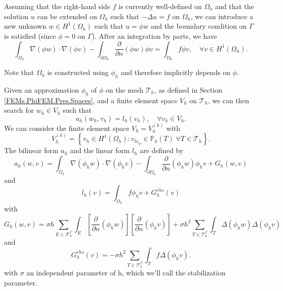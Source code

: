 Assuming that the right-hand side $f$ is currently well-defined on $\Omega_h$ and that the solution $u$ can be extended on $\Omega_h$ such that $-\Delta u=f$ on $\Omega_h$, we can introduce a new unknown $w\in H^1(\Omega_h)$ such that $u=\phi w$ and the boundary condition on $\Gamma$ is satisfied (since $\phi=0$ on $\Gamma$). After an integration by parts, we have
\begin{equation*}
	\int_{\Omega_h}\nabla(\phi w)\cdot\nabla(\phi v)-\int_{\partial\Omega_h}\frac{\partial}{\partial n}(\phi w)\phi v=\int_{\Omega_h} f\phi v,\quad \forall v\in H^1(\Omega_h).
\end{equation*}
\begin{Rem}
	Note that $\Omega_h$ is constructed using $\phi_h$ and therefore implicitly depends on $\phi$.
\end{Rem}
Given an approximation $\phi_h$ of $\phi$ on the mesh $\mathcal{T}_h$, as defined in Section \ref{FEMs.PhiFEM.Pres.Spaces}, and a finite element space $V_h$ on $\mathcal{T}_h$, we can then search for $w_h\in V_h$ such that
\begin{equation*}
	a_h(w_h,v_h)=l_h(v_h), \quad \forall v_h\in V_h.
\end{equation*}
We can consider the finite element space $V_h=V_h^{(k)}$ with
\begin{equation*}
	V_h^{(k)}=\left\{v_h\in H^1(\Omega_h):v_{h|_T}\in\mathbb{P}_k(T) \;  \forall T\in\mathcal{T}_h\right\}.
\end{equation*}
The bilinear form $a_h$ and the linear form $l_h$ are defined by
\begin{equation*}
	a_h(w,v)=\int_{\Omega_h} \nabla (\phi_h w) \cdot \nabla (\phi_h v) - \int_{\partial\Omega_h} \frac{\partial}{\partial n}(\phi_h w)\phi_h v+G_h(w,v)
\end{equation*}
and
\begin{equation*}
	l_h(v)=\int_{\Omega_h} f \phi_h v + G_h^{rhs}(v)
\end{equation*}
with
\begin{equation*}
G_h(w,v)=\sigma h\sum_{E\in\mathcal{F}_h^\Gamma} \int_E \left[\frac{\partial}{\partial n}(\phi_h w)\right] \left[\frac{\partial}{\partial n}(\phi_h v)\right]+\sigma h^2\sum_{T\in\mathcal{T}_h^\Gamma} \int_{T} \Delta(\phi_h w)\Delta(\phi_h v)
\end{equation*}
and
\begin{equation*}
G_h^{rhs}(v)=-\sigma h^2\sum_{T\in\mathcal{T}_h^\Gamma} \int_{T} f \Delta(\phi_h v).
\end{equation*}
with $\sigma$ an independent parameter of h, which we'll call the stabilization parameter.

